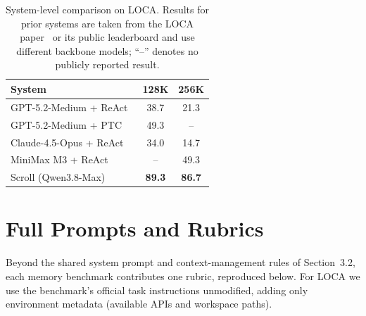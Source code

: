 \begin{table}[h]
  \centering
  \caption{System-level comparison on LOCA. Results for prior systems are
    taken from the LOCA paper~\citep{zeng2026loca} or its public leaderboard and use
    different backbone models; ``--'' denotes no publicly reported result.}
  \label{tab:loca-published}
  \small
  \begin{tabular}{lcc}
    \toprule
    System                                       & 128K          & 256K          \\
    \midrule
    GPT-5.2-Medium + ReAct~\citep{react}         & 38.7          & 21.3          \\
    GPT-5.2-Medium + PTC~\citep{ptc}             & 49.3          & --            \\
    Claude-4.5-Opus + ReAct~\citep{zeng2026loca} & 34.0          & 14.7          \\
    MiniMax M3 + ReAct~\citep{minimax-m3}        & --            & 49.3          \\
    \midrule
    Scroll (Qwen3.8-Max)                         & \textbf{89.3} & \textbf{86.7} \\
    \bottomrule
  \end{tabular}
\end{table}




\section{Full Prompts and Rubrics}
\label{app:prompts}

Beyond the shared system prompt and context-management rules of
Section~3.2, each memory benchmark contributes one rubric, reproduced
below. For LOCA we use the benchmark's official task instructions
unmodified, adding only environment metadata (available APIs and
workspace paths).

\newenvironment{rubricbox}[1]{%
  \begin{tcolorbox}[colback=codebg, colframe=codeframe, boxrule=0.6pt,
      left=6pt, right=6pt, top=5pt, bottom=5pt, breakable]%
    \textbf{#1}\\[4pt]\ttfamily\footnotesize\raggedright\hbadness=10000
    }{\end{tcolorbox}}

